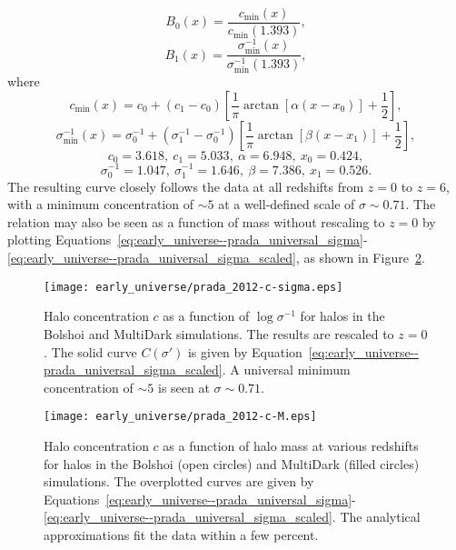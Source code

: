 \begin{equation}
	B_{0}(x) = \frac{c_{\min}(x)}{c_{\min}(1.393)},
\end{equation}
\begin{equation}
	B_{1}(x) = \frac{\sigma^{-1}_{\min}(x)}{\sigma^{-1}_{\min}(1.393)},
\end{equation}
where
\begin{equation}
	c_{\min}(x) = c_{0} + (c_{1} - c_{0}) \left[ \frac{1}{\pi} \arctan[\alpha(x - x_{0})] + \frac{1}{2} \right],
\end{equation}
\begin{equation}
	\sigma^{-1}_{\min}(x) = \sigma^{-1}_{0} + (\sigma^{-1}_{1} - \sigma^{-1}_{0}) \left[ \frac{1}{\pi} \arctan[\beta(x - x_{1})] + \frac{1}{2} \right],
\end{equation}
\begin{equation}
	c_{0} = 3.618,\ c_{1} = 5.033,\ \alpha = 6.948,\ x_{0} = 0.424,
\end{equation}
\begin{equation}
	\sigma^{-1}_{0} = 1.047,\ \sigma^{-1}_{1} = 1.646,\ \beta = 7.386,\ x_{1} = 0.526.
\end{equation}
The resulting curve closely follows the data at all redshifts from $z = 0$ to $z = 6$, with a minimum concentration of $\sim 5$ at a well-defined scale of $\sigma \sim 0.71$.  The relation may also be seen as a function of mass without rescaling to $z = 0$ by plotting Equations~\ref{eq:early_universe--prada_universal_sigma}-\ref{eq:early_universe--prada_universal_sigma_scaled}, as shown in Figure~\ref{fig:concentration--prada_c_M}.

\begin{figure}[tp]
	\centering
	\texttt{[image: early\_universe/prada\_2012-c-sigma.eps]}
	\caption[Halo concentration $c$ as a function of $\log \sigma^{-1}$]{\footnotesize Halo concentration $c$ as a function of $\log \sigma^{-1}$ for halos in the Bolshoi and MultiDark simulations.  The results are rescaled to $z = 0$.  The solid curve $C(\sigma')$ is given by Equation~\ref{eq:early_universe--prada_universal_sigma_scaled}.  A universal minimum concentration of $\sim 5$ is seen at $\sigma \sim 0.71$.  \citep{2012MNRAS.423.3018P}}
	\label{fig:concentration--prada_c_sigma}
\end{figure}

\begin{figure}[tp]
	\centering
	\texttt{[image: early\_universe/prada\_2012-c-M.eps]}
	\caption[Halo concentration $c$ as a function of halo mass]{\footnotesize Halo concentration $c$ as a function of halo mass at various redshifts for halos in the Bolshoi (open circles) and MultiDark (filled circles) simulations.  The overplotted curves are given by Equations~\ref{eq:early_universe--prada_universal_sigma}-\ref{eq:early_universe--prada_universal_sigma_scaled}.  The analytical approximations fit the data within a few percent.  \citep{2012MNRAS.423.3018P}}
	\label{fig:concentration--prada_c_M}
\end{figure}




